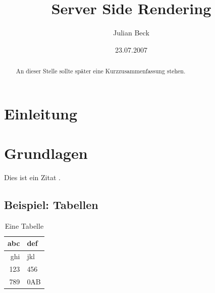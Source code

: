 \documentclass[runningheads]{llncs}
\title{Server Side Rendering}
\author{Julian Beck}
\institute{Betreuer: Prof. Dr. rer. nat. Christian Zirpins}
\date{23.07.2007}
\begin{document}
\let\oldaddcontentsline\addcontentsline
\def\addcontentsline#1#2#3{}
\maketitle
\def\addcontentsline#1#2#3{\oldaddcontentsline{#1}{#2}{#3}}


\begin{abstract}
  An dieser Stelle sollte später eine Kurzzusammenfassung stehen.
\end{abstract}

\tableofcontents 

\section{Einleitung}
\label{sec:Einleitung}

\lipsum


\section{Grundlagen}
\label{sec:Grundlagen}

\lipsum[1-2]

Dies ist ein Zitat \cite{becker2008a}.

\subsection{Beispiel: Tabellen}
\label{subsec:Tables}

\lipsum[3]

\begin{table}[h]
  \centering
  \caption{Eine Tabelle}
  \label{tab:atable}
  \begin{tabular}{|r|l|} \hline
    abc & def\\ \hline
    ghi & jkl\\ \hline
    123 & 456\\ \hline
    789 & 0AB\\ \hline
  \end{tabular}
\end{table}

\lipsum[4]
\end{document}
